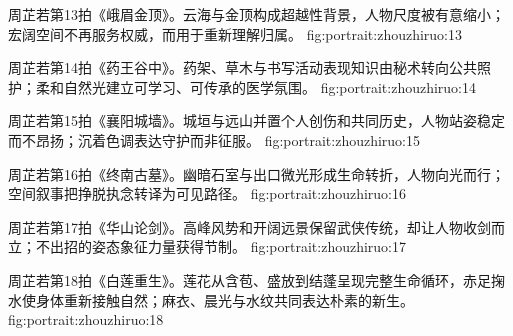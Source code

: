 \clearpage

  {周芷若第13拍《峨眉金顶》。云海与金顶构成超越性背景，人物尺度被有意缩小；宏阔空间不再服务权威，而用于重新理解归属。}
  {fig:portrait:zhouzhiruo:13}

  {周芷若第14拍《药王谷中》。药架、草木与书写活动表现知识由秘术转向公共照护；柔和自然光建立可学习、可传承的医学氛围。}
  {fig:portrait:zhouzhiruo:14}

  {周芷若第15拍《襄阳城墙》。城垣与远山并置个人创伤和共同历史，人物站姿稳定而不昂扬；沉着色调表达守护而非征服。}
  {fig:portrait:zhouzhiruo:15}

\clearpage

  {周芷若第16拍《终南古墓》。幽暗石室与出口微光形成生命转折，人物向光而行；空间叙事把挣脱执念转译为可见路径。}
  {fig:portrait:zhouzhiruo:16}

  {周芷若第17拍《华山论剑》。高峰风势和开阔远景保留武侠传统，却让人物收剑而立；不出招的姿态象征力量获得节制。}
  {fig:portrait:zhouzhiruo:17}

  {周芷若第18拍《白莲重生》。莲花从含苞、盛放到结蓬呈现完整生命循环，赤足掬水使身体重新接触自然；麻衣、晨光与水纹共同表达朴素的新生。}
  {fig:portrait:zhouzhiruo:18}
